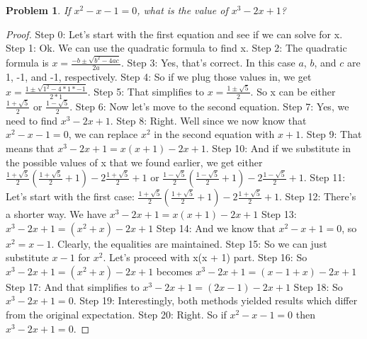 \documentclass{article}
\newtheorem{theorem}{Problem}
\begin{document}
\begin{theorem}
If $x^2 - x - 1 = 0$, what is the value of $x^3 - 2x + 1$?
\end{theorem}

\begin{proof}
Step 0: Let's start with the first equation and see if we can solve for x.
Step 1: Ok. We can use the quadratic formula to find x.
Step 2: The quadratic formula is $x = \frac{-b \pm \sqrt{b^2 - 4ac}}{2a}$.
Step 3: Yes, that's correct. In this case $a$, $b$, and $c$ are 1, -1, and -1, respectively.
Step 4: So if we plug those values in, we get $x = \frac{1 \pm \sqrt{1^2 - 4*1*-1}}{2*1}$.
Step 5: That simplifies to $x = \frac{1 \pm \sqrt{5}}{2}$. So x can be either $\frac{1 + \sqrt{5}}{2}$ or $\frac{1 - \sqrt{5}}{2}$.
Step 6: Now let's move to the second equation.
Step 7: Yes, we need to find $x^3 - 2x + 1$.
Step 8: Right. Well since we now know that $x^2 - x - 1 = 0$, we can replace $x^2$ in the second equation with $x + 1$.
Step 9: That means that $x^3 - 2x + 1 = x(x + 1) - 2x + 1$.
Step 10: And if we substitute in the possible values of x that we found earlier, we get either $\frac{1 + \sqrt{5}}{2}(\frac{1 + \sqrt{5}}{2} + 1) - 2\frac{1 + \sqrt{5}}{2} + 1$ or $\frac{1 - \sqrt{5}}{2}(\frac{1 - \sqrt{5}}{2} + 1) - 2\frac{1 - \sqrt{5}}{2} + 1$.
Step 11: Let's start with the first case: $\frac{1 + \sqrt{5}}{2}(\frac{1 + \sqrt{5}}{2} + 1) - 2\frac{1 + \sqrt{5}}{2} + 1$.
Step 12: There's a shorter way. We have  $x^3 - 2x + 1 = x(x + 1) - 2x + 1$
Step 13: $x^3 - 2x + 1 = (x^2 + x) - 2x + 1$
Step 14: And we know that $x^2 - x + 1 = 0$, so $x^2 = x - 1$. Clearly, the equalities are maintained.
Step 15: So we can just substitute $x - 1$ for $x^2$. Let's proceed with x(x + 1) part.
Step 16: So $x^3 - 2x + 1 = (x^2 + x) - 2x + 1$ becomes $x^3 - 2x + 1 = (x - 1 + x) - 2x + 1$
Step 17: And that simplifies to $x^3 - 2x + 1 = (2x - 1) - 2x + 1$
Step 18: So $x^3 - 2x + 1 = 0$.
Step 19: Interestingly, both methods yielded results which differ from the original expectation.
Step 20: Right. So if $x^2 - x - 1 = 0$ then $x^3 - 2x + 1 = 0$.
\end{proof}
\end{document}
